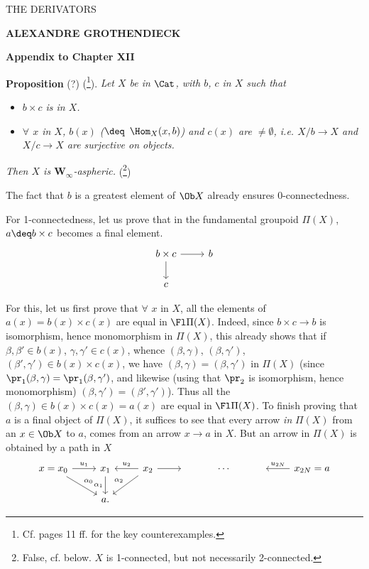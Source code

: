 \printedpage{}

\begin{center}
{\LARGE\textsf{THE DERIVATORS}}

\bigskip

\textbf{ALEXANDRE GROTHENDIECK}

\bigskip\bigskip

{\large\textbf{Appendix to Chapter XII}}
\end{center}

\newpage


\textbf{Proposition} (?) (\footnote{Cf. pages 11 ff. for the key counterexamples.}). \textit{Let $X$ be in} $\Cat$\textit{, with $b$, $c$ in $X$ such that}

\begin{itemize}
\item[\textit{a)}] \textit{$b\times c$ is in $X$.}
\item[\textit{b)}] \textit{$\forall$ $x$ in $X$, $b(x)$ ($\deq$} $\Hom_X(x,b)$\textit{) and $c(x)$ are $\neq\emptyset$, i.e. $X/b \longrightarrow X$ and $X/c \longrightarrow X$ are surjective on objects.}
\end{itemize}

\textit{Then $X$ is $\mathbf{W}_\infty$-aspheric.} (\footnote{False, cf. below. $X$ is 1-connected, but not necessarily 2-connected.})

The fact that $b$ is a greatest element of $\Ob X$ already ensures 0-connectedness.

For 1-connectedness, let us prove that in the fundamental groupoid $\Pi(X)$, $a \deq b\times c$ becomes a final element.
\[
\begin{tikzcd}
b\times c \arrow[r] \arrow[d] & b \\
c &
\end{tikzcd}
\]

For this, let us first prove that $\forall$ $x$ in $X$, all the elements of $a(x) = b(x)\times c(x)$ are equal in $\Fl\Pi(X)$. Indeed, since $b\times c \longrightarrow b$ is isomorphism, hence monomorphism in $\Pi(X)$, this already shows that if $\beta,\beta'\in b(x)$, $\gamma,\gamma'\in c(x)$, whence $(\beta,\gamma)$, $(\beta,\gamma')$, $(\beta',\gamma')\in b(x)\times c(x)$, we have $(\beta,\gamma) = (\beta,\gamma')$ in $\Pi(X)$ (since $\pr_1(\beta,\gamma) = \pr_1(\beta,\gamma')$, and likewise (using that $\pr_2$ is isomorphism, hence monomorphism) $(\beta,\gamma') = (\beta',\gamma')$). Thus all the $(\beta,\gamma)\in b(x)\times c(x) = a(x)$ are equal in $\Fl\Pi(X)$. To finish proving that $a$ is a final object of $\Pi(X)$, it suffices to see that every arrow \textit{in} $\Pi(X)$ from an $x\in\Ob X$ to $a$, comes from an arrow $x\longrightarrow a$ in $X$. But an arrow in $\Pi(X)$ is obtained by a path in $X$
\[
\begin{tikzcd}
x = x_0 \arrow[r, "u_1"] \arrow[dr, "\alpha_0"] & x_1 \arrow[d, "\alpha_1"'] & x_2 \arrow[l, "u_2"'] \arrow[r] \arrow[dl, "\alpha_2"'] & {} & \cdots & {} & x_{2N} = a \arrow[l, "u_{2N}"'] \\
& a. & & & & &
\end{tikzcd}
\]

